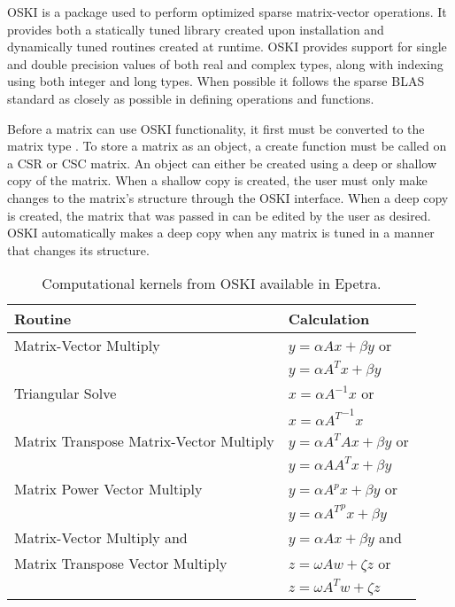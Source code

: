 OSKI is a package used to perform optimized sparse matrix-vector operations.
It provides both a statically tuned library created upon installation
and dynamically tuned routines created at runtime.  
OSKI provides support for single and double
precision values of both real and complex types, along with indexing using both integer
and long types.  When possible it follows the sparse BLAS standard \cite{IK:SBLAS}
 as closely as possible in defining operations and functions.  

Before a matrix can use OSKI functionality, it first must be converted to the matrix
type .  To store a matrix as an  object, a create function
must be called on a CSR or CSC matrix.  An  object can either be created using
a deep or shallow copy of the matrix.  When a shallow copy is created, the user must
only make changes to the matrix's structure through the OSKI interface.  When a deep
copy is created, the matrix that was passed in can be edited by the user as desired.
OSKI automatically makes a deep copy when any matrix is tuned in a manner that changes its structure.

\begin{table}[htbp] 
\begin{center}
\begin{tabular}{|l|l|}
	\hline
Routine & Calculation  \\
	\hline
Matrix-Vector Multiply   & $y = \alpha Ax + \beta y$ or  \\
 & $y = \alpha A^Tx + \beta y$ \\ \hline
Triangular Solve   & $x = \alpha A^{-1}x$ or \\
 & $x = \alpha {A^T}^{-1}x$\\ \hline
Matrix Transpose Matrix-Vector Multiply & $y = \alpha A^TAx + \beta y$ or \\
 & $y = \alpha AA^Tx + \beta y$ \\ \hline
Matrix Power Vector Multiply  & $y = \alpha A^px + \beta y$ or \\
 & $y = \alpha {A^T}^px + \beta y$\\ \hline
Matrix-Vector Multiply and & $y = \alpha Ax + \beta y$ and \\ 
Matrix Transpose Vector Multiply & $z = \omega Aw + \zeta z$ or \\
 & $z = \omega A^Tw + \zeta z$ \\
	\hline
\end{tabular}
\caption{Computational kernels from OSKI available in Epetra.}
\label{IK:fig:oskikernels}
\end{center}
\end{table}

